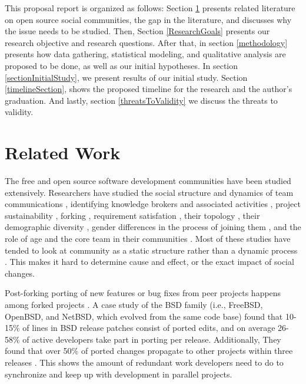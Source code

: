 \documentclass[11pt]{report}
\begin{document}

This proposal report is organized as follows: Section \ref{relatedwork} presents related literature on open source social communities, the gap in the literature, and discusses why the issue needs to be studied. 
Then, Section \ref{ResearchGoals} presents our research objective and research questions. After that, in section \ref{methodology} presents how data gathering, statistical modeling, and qualitative analysis are proposed to be done, as well as our initial hypotheses. In section \ref{sectionInitialStudy}, we present results of our initial study. Section \ref{timelineSection}, shows the proposed timeline for the research and the author's graduation. And lastly, section \ref{threatsToValidity} we discuss the threats to validity.\\
\pagebreak

\section{Related Work}
\label{relatedwork}

The free and open source software development communities have been studied extensively. Researchers have studied the social structure and dynamics of team communications \cite{Bird}\cite{Guzzi}\cite{HowisonSocialDynamics}\cite{HowisonFlossMole}\cite{Nakakoji}, identifying knowledge brokers and associated activities \cite{Sowe}, project sustainability \cite{Nakakoji}\cite{NymanForkingSustainability}, forking \cite{NymanCodeForking}, requirement satisfation \cite{Ernst}, their topology \cite{Bird}, their demographic diversity \cite{Kunegis}, gender differences in the process of joining them \cite{Kuechler}, and the role of age and the core team in their communities \cite{AzarbakhtOSS2014}\cite{AzarbakhtINSNA2014}\cite{DavidsonVLHCC2014}\cite{Torres}. Most of these studies have tended to look at community as a static structure rather than a dynamic process \cite{CrowstonFLOSSWhatWeKnow}. This makes it hard to determine cause and effect, or the exact impact of social changes.

Post-forking porting of new features or bug fixes from peer projects happens among forked projects \cite{Baishakhi}. A case study of the BSD family (i.e., FreeBSD, OpenBSD, and NetBSD, which evolved from the same code base) found that 10-15\% of lines in BSD release patches consist of ported edits, and on average 26-58\% of active developers take part in porting per release. Additionally, They found that over 50\% of ported changes propagate to other projects within three releases \cite{Baishakhi}. This shows the amount of redundant work developers need to do to synchronize and keep up with development in parallel projects. 
\end{document}
